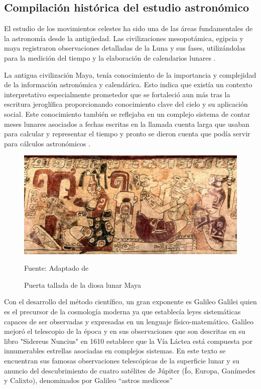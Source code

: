 \subsection{Compilación histórica del estudio astronómico}
El estudio de los movimientos celestes ha sido una de las áreas fundamentales de la astronomía desde la antigüedad. 
Las civilizaciones mesopotámica, egipcia y maya registraron observaciones detalladas de la Luna y sus fases, utilizándolas para
la medición del tiempo y la elaboración de calendarios lunares \cite{antigua}.

La antigua civilización Maya, tenía conocimiento de la importancia y complejidad de la información
astronómica y calendárica. Esto indica que existía un contexto interpretativo especialmente prometedor que se 
fortaleció aun más tras la escritura jeroglífica proporcionando conocimiento clave del cielo y su aplicación social. Este conocimiento también
se reflejaba en un complejo sistema de contar meses lunares asociados a fechas escritas en la llamada cuenta larga que usaban para calcular y representar
el tiempo y pronto se dieron cuenta que podía servir para cálculos astronómicos \cite{maya}.


\begin{figure}[h]
    \includegraphics[scale = 0.7]{Imagenes/MayasMoon.png}
    \centering
    \caption{Puerta tallada de la diosa lunar Maya}{Fuente: Adaptado de \cite{ixchel}}
\end{figure}


Con el desarrollo del método científico, un gran exponente es Galileo Galilei quien es el precursor de la cosmología moderna ya que establecía
leyes sistemáticas capaces de ser observadas y expresadas en un lenguaje físico-matemático. Galileo mejoró el telescopio de la época y en sus observaciones
que son descritas en su libro "Sidereus Nuncius" \cite{sidereus} en 1610 establece que la Vía Láctea está compuesta por innumerables estrellas asociadas en complejos sistemas. En este texto se encuentran sus famosas observaciones telescópicas de la superficie lunar
y su anuncio del descubrimiento de cuatro satélites de Júpiter
(Ío, Europa, Ganímedes y Calixto), denominados por Galileo
“astros mediceos”


